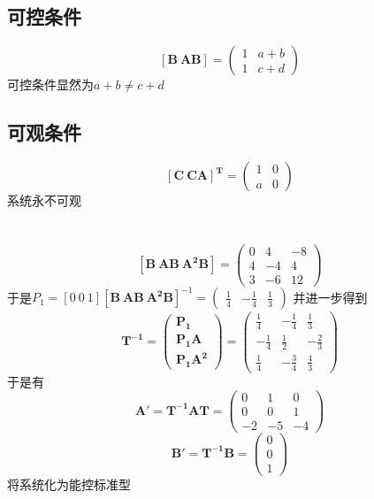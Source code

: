 \documentclass[UTF8,a4paper]{ctexart}
\begin{document}
\subsection{可控条件}
$$\mathbf{[B \ AB ]}=\begin{pmatrix}
1&a+b \\
1&c+d \end{pmatrix}$$
可控条件显然为$a+b \neq c+d$
\subsection{可观条件}
$$\mathbf{[C \ CA ]^T}=\begin{pmatrix}
1&0\\
a&0\end{pmatrix}$$
系统永不可观
\section{}
$$\mathbf{[B \ AB \ A^2B]}=\begin{pmatrix}
0&4&-8\\
4&-4&4\\
3&-6&12
\end{pmatrix}$$
于是$P_1=[0\ 0\ 1]\mathbf{[B \ AB \ A^2B]}^{-1}=\begin{pmatrix}
\frac{1}{4}&-\frac{1}{4}&\frac{1}{3}\end{pmatrix}$
并进一步得到$$\mathbf{T^{-1}}=\begin{pmatrix}
\mathbf{P_1}\\
\mathbf{P_1A}\\
\mathbf{P_1A^2}\end{pmatrix}
=\begin{pmatrix}
\frac{1}{4}&-\frac{1}{4}&\frac{1}{3}\\
-\frac{1}{4}&\frac{1}{2}&-\frac{2}{3}\\
\frac{1}{4}&-\frac{3}{4}&\frac{4}{3}\end{pmatrix}$$
于是有$$\mathbf{A'}=\mathbf{T^{-1}AT}=\begin{pmatrix}
0&1&0\\
0&0&1\\
-2&-5&-4\end{pmatrix}$$
$$\mathbf{B'}=\mathbf{T^{-1}B}=\begin{pmatrix}0\\0\\1\end{pmatrix}$$将系统化为能控标准型
\end{document}
